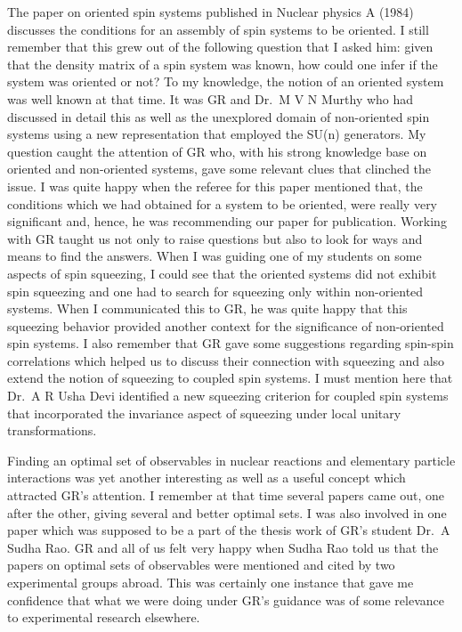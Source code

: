 The paper on oriented spin systems published in Nuclear physics A (1984) discusses the conditions for an assembly of spin systems to be oriented. I still remember that this grew out of the following question that I asked him: given that the density matrix of a spin system was known, how could one infer if the system was oriented or not? To my knowledge, the notion of an oriented system was well known at that time. It was GR and Dr.\ M V N Murthy who had discussed in detail this as well as the unexplored domain of non-oriented spin systems using a new representation that employed the SU(n) generators. My question caught the attention of GR who, with his strong knowledge base on oriented and non-oriented systems, gave some relevant clues that clinched the issue. I was quite happy when the referee for this paper mentioned that, the conditions which we had obtained for a system to be oriented, were really very significant and, hence, he was recommending our paper for publication. Working with GR taught us not only to raise questions but also to look for ways and means to find the answers. When I was guiding one of my students on some aspects of spin squeezing, I could see that the oriented systems did not exhibit spin squeezing and one had to search for squeezing only within non-oriented systems. When I communicated this to GR, he was quite happy that this squeezing behavior provided another context for the significance of non-oriented spin systems. I also remember that GR gave some suggestions regarding spin-spin correlations which helped us to discuss their connection with squeezing and also extend the notion of squeezing to coupled spin systems. I must mention here that Dr.\ A R Usha Devi identified a new squeezing criterion for coupled spin systems that incorporated the invariance aspect of squeezing under local unitary transformations.
\newpage

Finding an optimal set of observables in nuclear reactions and elementary particle interactions was yet another interesting as well as a useful concept which attracted GR's attention. I remember at that time several papers came out, one after the other, giving several and better optimal sets. I was also involved in one paper which was supposed to be a part of the thesis work of GR's student Dr.\ A Sudha Rao. GR and all of us felt very happy when Sudha Rao told us that the papers on optimal sets of observables were mentioned and cited by two experimental groups abroad. This was certainly one instance that gave me confidence that what we were doing under GR's guidance was of some relevance to experimental research elsewhere.

